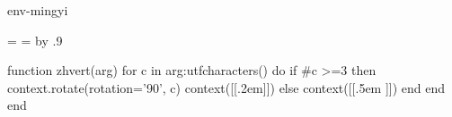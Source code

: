 \startenvironment env-mingyi
\usemodule[zhfonts]

\setupzhfonts
  [serif]
  [bold=kaiti,
   italic=kaiti,
   bolditalic=kaiti]
\setupmathematics[integral=nolimits] %

\setupinteraction
  [state=start,
    title={概率论},
    subtitle={科学逻辑},
    keyword={概率论, 逻辑学},
    author={E. T. Jaynes（著） 明夷船（译）},
    focus=standard,
    style=normal]

\setupinteractionscreen[option=bookmark]

\setuppapersize[A4][A4]
\setuplayout[backspace=26mm, 
             width=158mm, 
             topspace=30mm,
             hight=242mm,
             header=15mm, 
             footer=10mm]
\setuppagenumbering[alternative=doublesided]

\setuppagenumbering[location=]

\newdimen\headerwidth
\headerwidth=\the\makeupwidth
\newdimen\footerwidth
\footerwidth=\the\makeupwidth
\advance\footerwidth by .9\rightmarginwidth
\newdimen\LineWidth
\LineWidth=1pt

\startluacode
function zhvert(arg)
    for c in arg:utfcharacters() do
        if #c >=3 then
            context.rotate({rotation='90'}, c)
            context([[\kern.2em]])
        else
            context([[\kern.5em ]])
        end
    end
end
\stopluacode
\def\zhvert#1{\ctxlua{zhvert('#1')}}

\def\doubleruletext#1{%
  \framed[width={\headerwidth},
    frame=off,
    rulethickness=0.5pt,
    location=lohi,
    depth=-0.25em,
    bottomframe=on,
    offset=1pt]{#1}}
\def\HeaderFrame#1{\doubleruletext{\doubleruletext{\bf #1}}}
\def\PageNumberFrame{\inframed[frame=off]{\tfx\pagenumber}}
\def\HeadStr#1{\headnumber[#1]\hskip1em\getmarking[#1]}
\def\RightHeader{\HeaderFrame{\HeadStr{section}\hfill\PageNumberFrame\hbox to -\LineWidth{}}}
\def\LeftHeader{\HeaderFrame{\hbox to -\LineWidth{}{\PageNumberFrame}\hfill\HeadStr{chapter}}}

\def\FooterFrame#1{%
  \framed[width={\footerwidth}, frame=off, offset=0pt]{#1}}
\def\BookNameFrame[#1]{%
  \framed[width=fit, height=fit, frame=off, offset=0pt]{%
    \hskip2em\rotate[rotation=#1]{\zhvert{概率论}\raise.15em\hbox{——}\zhvert{科学逻辑}}\hskip2em}}
\def\RightFooter{\FooterFrame{\hfill\BookNameFrame[-90]}}
\def\LeftFooter{\FooterFrame{\BookNameFrame[-90]\hfill}}

